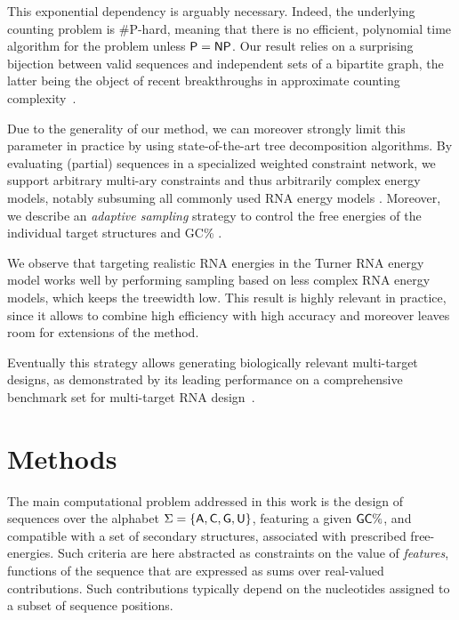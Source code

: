 \documentclass[twocolumn]{bmcart}%
\newcommand{\Def}[1]{\emph{#1}}
\newcommand{\Nuc}[1]{{\sf #1}}
\newcommand{\Ab}{\Nuc{A}}
\newcommand{\Cb}{\Nuc{C}}
\newcommand{\Gb}{\Nuc{G}}
\newcommand{\Ub}{\Nuc{U}}
\newcommand{\GCb}{\Gb\Cb}
\newcommand{\citep}[1]{\cite{#1}}
\begin{document}
This exponential dependency is arguably necessary. Indeed, the underlying counting problem is \#{\sf P}-hard, meaning that there is no efficient, polynomial time algorithm for the problem unless ${\sf P}={\sf NP}$. Our result relies on a surprising bijection between valid sequences and independent sets of a bipartite graph, the latter being the object of recent breakthroughs in approximate counting complexity~\citep{Bulatov2013,Cai2016}.

%
Due to the generality of our method, we can moreover strongly limit this parameter in practice by using state-of-the-art tree decomposition algorithms.
By evaluating (partial) sequences in a specialized weighted constraint
network, we support arbitrary multi-ary constraints and thus
arbitrarily complex energy models,
notably subsuming all commonly
used RNA energy models%
.  Moreover, we describe an \Def{adaptive
  sampling} strategy to control the free energies of the individual
target structures and \GCb\%%
. %





We observe that
targeting realistic RNA energies in the
Turner RNA energy model
works well by performing sampling based on less complex RNA energy models, which keeps the treewidth low. This result is highly relevant in practice, since it allows to combine high efficiency with high accuracy and moreover leaves room for extensions of the method.

Eventually this strategy allows generating biologically relevant
multi-target designs, as demonstrated by its leading performance on a comprehensive benchmark set for multi-target RNA design~\citep{Taneda2015}.

\section*{Methods}
The main computational problem addressed in this work is the design of sequences over the alphabet $\Sigma=\{\Ab,\Cb,\Gb,\Ub\}$, featuring a given $\GCb\%$, and compatible with a set of secondary structures, associated with prescribed free-energies.
Such criteria are here abstracted as constraints on the value of \Def{features}, functions of the sequence that are expressed as sums over real-valued contributions. Such contributions typically depend on the nucleotides assigned to a subset of sequence positions.
\end{document}
